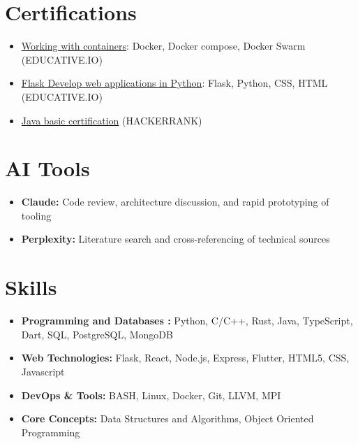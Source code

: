 \documentclass{article}
\begin{document}
\section*{Certifications}
\begin{itemize}
	\item \href{https://www.educative.io/verify-certificate/Y5xyKBov0ppTp41gXrqlx5c3LGP7RAWBVHJ}{Working with containers}: Docker, Docker compose, Docker Swarm (EDUCATIVE.IO)
	\item \href{https://www.educative.io/verify-certificate/j2l3BzfZ3O94zqGqKSjXR9PNLqr7uA}{Flask Develop web applications in Python}: Flask, Python, CSS, HTML (EDUCATIVE.IO)
	\item \href{https://www.hackerrank.com/certificates/388867dc0d5f}{Java basic certification} (HACKERRANK)
\end{itemize}

\section*{AI Tools}
\begin{itemize}[leftmargin=*, itemsep=0pt, parsep=0pt]
	\item \textbf{Claude:} Code review, architecture discussion, and rapid prototyping of tooling
	\item \textbf{Perplexity:} Literature search and cross-referencing of technical sources
\end{itemize}

\section*{Skills}
\begin{itemize}[leftmargin=*, itemsep=0pt, parsep=0pt]
	\item \textbf{Programming and Databases :} Python, C/C++, Rust, Java, TypeScript, Dart, SQL, PostgreSQL, MongoDB
	\item \textbf{Web Technologies:} Flask, React, Node.js, Express, Flutter, HTML5, CSS, Javascript
	\item \textbf{DevOps \& Tools:} BASH, Linux, Docker, Git, LLVM, MPI
	\item \textbf{Core Concepts:} Data Structures and Algorithms, Object Oriented Programming
\end{itemize}
\end{document}

